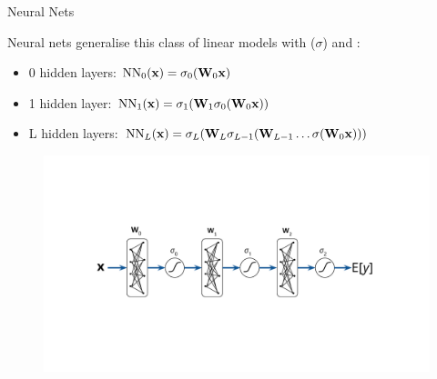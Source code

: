 \documentclass[lualatex, aspectratio=169]{beamer}
\begin{document}
\begin{frame}{Neural Nets}
  
  Neural nets generalise this class of linear models with  ($\sigma$) and :
  \begin{itemize}
    \item 0 hidden layers: $\text{NN}_0(\mathbf{x}) = \sigma_0( \mathbf{W}_0\mathbf{x} )$
    \item 1 hidden layer: $\text{NN}_1(\mathbf{x}) = \sigma_1(\mathbf{W}_1 \sigma_0( \mathbf{W}_0 \mathbf{x} ))$
    \item L hidden layers: $\text{NN}_L(\mathbf{x}) = \sigma_L(\mathbf{W}_L \sigma_{L-1}(\mathbf{W}_{L-1} \ldots \sigma( \mathbf{W}_0 \mathbf{x} )))$
  \end{itemize}

  \begin{figure}
    \includegraphics[page=1, trim={3cm 4.5cm 3.5cm 4.5cm}, clip, width=0.5\pagewidth]{assets/pictures.pdf}
  \end{figure}
  
\end{frame}
\end{document}
